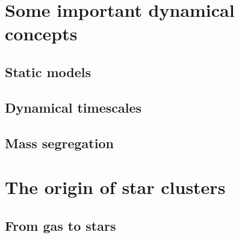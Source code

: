 %
%

%


\section{Some important dynamical concepts}

\subsection{Static models}
\subsection{Dynamical timescales}
\subsection{Mass segregation}


\section{The origin of star clusters}

\subsection{From gas to stars}

